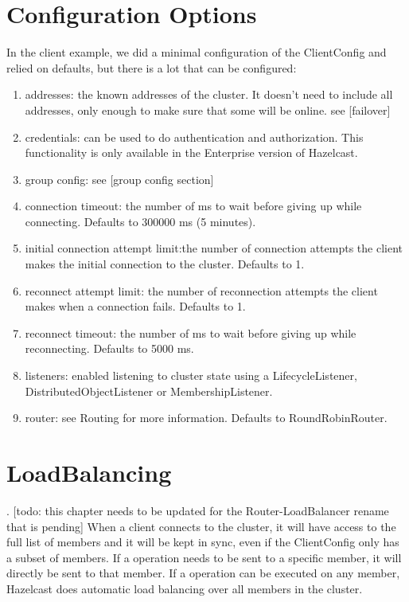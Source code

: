 \section{Configuration Options}
In the client example, we did a minimal configuration of the ClientConfig and relied on defaults, but there is a lot that can be configured:
\begin{enumerate}
\item addresses: the known addresses of the cluster. It doesn't need to include all addresses, only enough to make sure that some will be online. see [failover]
\item credentials: can be used to do authentication and authorization. This functionality is only available in the Enterprise version of Hazelcast.
\item group config: see [group config section]
\item connection timeout: the number of ms to wait before giving up while connecting. Defaults to 300000 ms (5 minutes).
\item initial connection attempt limit:the  number of connection attempts the client makes the initial connection to the cluster. Defaults to 1.
\item reconnect attempt limit: the number of reconnection attempts the client makes when a connection fails. Defaults to 1.
\item reconnect timeout: the number of ms to wait before giving up while reconnecting. Defaults to 5000 ms.
\item listeners: enabled listening to cluster state using a LifecycleListener, DistributedObjectListener or MembershipListener.
\item router: see Routing for more information. Defaults to RoundRobinRouter.
\end{enumerate}

\section{LoadBalancing}.
[todo: this chapter needs to be updated for the Router-LoadBalancer rename that is pending]
When a client connects to the cluster, it will have access to the full list of members and it will be kept in sync, even if the ClientConfig only has a subset of members. If a operation needs to be sent to a specific member, it will directly be sent to that member. If a operation can be executed on any member, Hazelcast does automatic load balancing over all members in the cluster. 

